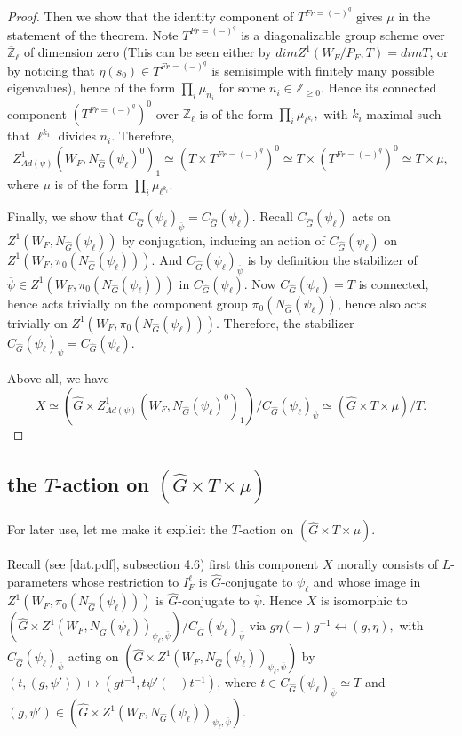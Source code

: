 \documentclass{article}
\begin{document}
\begin{proof}
		Then we show that the identity component of $T^{Fr=(-)^q}$ gives $\mu$ in the statement of the theorem. Note $T^{Fr=(-)^q}$ is a diagonalizable group scheme over $\overline{\mathbb{Z}}_{\ell}$ of dimension zero (This can be seen either by $dimZ^1(W_F/P_F, T)=dimT$, or by noticing that $\eta(s_0) \in T^{Fr=(-)^q}$ is semisimple with finitely many possible eigenvalues), hence of the form $\prod_i\mu_{n_i}$ for some $n_i \in \mathbb{Z}_{\geq 0}$. Hence its connected component $(T^{Fr=(-)^q})^0$ over $\overline{\mathbb{Z}}_{\ell}$ is of the form $\prod_i\mu_{\ell^{k_i}},$ with $k_i$ maximal such that $\ell^{k_i}$ divides $n_i$. Therefore, 
		$$Z^1_{Ad(\psi)}(W_F, N_{\hat{G}}(\psi_{\ell})^0)_1 \simeq (T \times T^{Fr=(-)^q})^0 \simeq T \times (T^{Fr=(-)^q})^0 \simeq T \times \mu,$$
		where $\mu$ is of the form $\prod_i\mu_{\ell^{k_i}}$.
		
		Finally, we show that $C_{\hat{G}}(\psi_{\ell})_{\overline{\psi}}=C_{\hat{G}}(\psi_{\ell})$. Recall $C_{\hat{G}}(\psi_{\ell})$ acts on $Z^1(W_F, N_{\hat{G}}(\psi_{\ell}))$ by conjugation, inducing an action of $C_{\hat{G}}(\psi_{\ell})$ on $Z^1(W_F, \pi_0(N_{\hat{G}}(\psi_{\ell}))).$ And $C_{\hat{G}}(\psi_{\ell})_{\overline{\psi}}$ is by definition the stabilizer of $\overline{\psi} \in Z^1(W_F, \pi_0(N_{\hat{G}}(\psi_{\ell})))$ in $C_{\hat{G}}(\psi_{\ell})$. Now $C_{\hat{G}}(\psi_{\ell})=T$ is connected, hence acts trivially on the component group $\pi_0(N_{\hat{G}}(\psi_{\ell}))$, hence also acts trivially on $Z^1(W_F, \pi_0(N_{\hat{G}}(\psi_{\ell})))$. Therefore, the stabilizer $C_{\hat{G}}(\psi_{\ell})_{\overline{\psi}}=C_{\hat{G}}(\psi_{\ell})$.
		
		Above all, we have 
		$$X \simeq (\hat{G} \times Z^1_{Ad(\psi)}(W_F, N_{\hat{G}}(\psi_{\ell})^0)_1)/C_{\hat{G}}(\psi_{\ell})_{\overline{\psi}} \simeq (\hat{G} \times T \times \mu)/T.$$
		
	\end{proof}
	
	\subsection{the $T$-action on $(\hat{G} \times T \times \mu)$}
	
	For later use, let me make it explicit the $T$-action on $(\hat{G} \times T \times \mu)$.
	
	Recall (see [dat.pdf], subsection 4.6) first this component $X$ morally consists of $L$-parameters whose restriction to $I_F^\ell$ is $\hat{G}$-conjugate to $\psi_{\ell}$ and whose image in $Z^1(W_F, \pi_0(N_{\hat{G}}(\psi_{\ell})))$ is $\hat{G}$-conjugate to $\overline{\psi}$. Hence $X$ is isomorphic to $(\hat{G} \times Z^1(W_F, N_{\hat{G}}(\psi_{\ell}))_{\psi_{\ell}, \overline{\psi}})/C_{\hat{G}}(\psi_{\ell})_{\overline{\psi}}$ via $g\eta(-)g^{-1} \mapsfrom (g, \eta),$ with $C_{\hat{G}}(\psi_{\ell})_{\overline{\psi}}$ acting on $(\hat{G} \times Z^1(W_F, N_{\hat{G}}(\psi_{\ell}))_{\psi_{\ell}, \overline{\psi}})$ by $(t, (g, \psi')) \mapsto (gt^{-1}, t\psi'(-)t^{-1})$, where $t \in C_{\hat{G}}(\psi_{\ell})_{\overline{\psi}} \simeq T$ and $(g, \psi') \in (\hat{G} \times Z^1(W_F, N_{\hat{G}}(\psi_{\ell}))_{\psi_{\ell}, \overline{\psi}})$.
	
\end{document}
